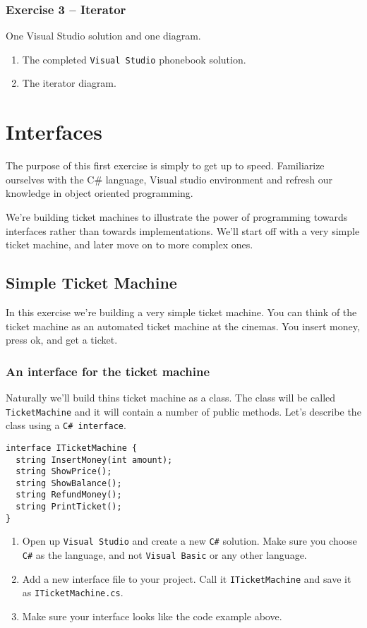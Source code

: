\documentclass{article}
\newcounter{stepcounter}
\newenvironment{steps}{ 
  \begin{enumerate}[label=\color{red}Step \thesection-\theenumi)]
    \setcounter{enumi}{\value{stepcounter}}
}{
  \setcounter{stepcounter}{\value{enumi}}
  \end{enumerate}
}
\begin{document}
\subsubsection*{Exercise 3 -- Iterator}
One Visual Studio solution and one diagram.
\begin{enumerate}
  \item The completed \texttt{Visual Studio} phonebook solution.
  \item The iterator diagram.
\end{enumerate}








\setcounter{stepcounter}{0}
\pagebreak
\section{Interfaces}
The purpose of this first exercise is simply to get up to speed. Familiarize ourselves with the C\# language, Visual studio environment and refresh our knowledge in object oriented programming.

We're building ticket machines to illustrate the power of programming towards interfaces rather than towards implementations. We'll start off with a very simple ticket machine, and later move on to more complex ones.

\subsection{Simple Ticket Machine}
In this exercise we’re building a very simple ticket machine. You can think of the ticket machine as an automated ticket machine at the cinemas. You insert money, press ok, and get a ticket.


\subsubsection{An interface for the ticket machine}
Naturally we'll build thins ticket machine as a class. The class will be called \texttt{TicketMachine} and it will contain a number of public methods. Let's describe the class using a \texttt{C\# interface}.

\begin{lstlisting}
interface ITicketMachine {
  string InsertMoney(int amount);
  string ShowPrice();
  string ShowBalance();
  string RefundMoney();
  string PrintTicket();
}
\end{lstlisting}
\begin{steps}
\item Open up \texttt{Visual Studio} and create a new \texttt{C\#} solution. Make sure you choose \texttt{C\#} as the language, and not \texttt{Visual Basic} or any other language.
\item Add a new interface file to your project. Call it \texttt{ITicketMachine} and save it as \texttt{ITicketMachine.cs}.
\item Make sure your interface looks like the code example above.
\end{steps}
\end{document}
